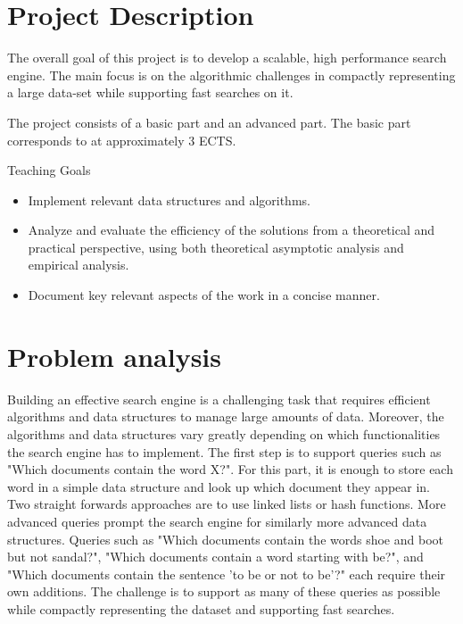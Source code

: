 \section{Project Description}
The overall goal of this project is to develop a scalable, high performance search engine. The main focus is on the algorithmic challenges in compactly representing a large data-set while supporting fast searches on it. 

The project consists of a basic part and an advanced part. The basic part corresponds to at approximately 3 ECTS. 

Teaching Goals
\begin{itemize}
    \item Implement relevant data structures and algorithms. 
    \item Analyze and evaluate the efficiency of the solutions from a theoretical and practical perspective, using both theoretical asymptotic analysis and empirical analysis.
    \item Document key relevant aspects of the work in a concise manner. 
\end{itemize}

\section{Problem analysis}

Building an effective search engine is a challenging task that requires efficient algorithms and data structures to manage large amounts of data. Moreover, the algorithms and data structures vary greatly depending on which functionalities the search engine has to implement. The first step is to support queries such as "Which documents contain the word X?". For this part, it is enough to store each word in a simple data structure and look up which document they appear in. Two straight forwards approaches are to use linked lists or hash functions. More advanced queries prompt the search engine for similarly more advanced data structures. Queries such as "Which documents contain the words shoe and boot but not sandal?", "Which documents contain a word starting with be?", and "Which documents contain the sentence 'to be or not to be'?" each require their own additions. The challenge is to support as many of these queries as possible while compactly representing the dataset and supporting fast searches. 



